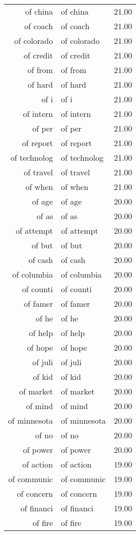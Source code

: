 \begin{table}[ht]
\begin{tabular}{rlr}
  of china & of china & 21.00 \\ 
  of coach & of coach & 21.00 \\ 
  of colorado & of colorado & 21.00 \\ 
  of credit & of credit & 21.00 \\ 
  of from & of from & 21.00 \\ 
  of hard & of hard & 21.00 \\ 
  of i & of i & 21.00 \\ 
  of intern & of intern & 21.00 \\ 
  of per & of per & 21.00 \\ 
  of report & of report & 21.00 \\ 
  of technolog & of technolog & 21.00 \\ 
  of travel & of travel & 21.00 \\ 
  of when & of when & 21.00 \\ 
  of age & of age & 20.00 \\ 
  of as & of as & 20.00 \\ 
  of attempt & of attempt & 20.00 \\ 
  of but & of but & 20.00 \\ 
  of cash & of cash & 20.00 \\ 
  of columbia & of columbia & 20.00 \\ 
  of counti & of counti & 20.00 \\ 
  of famer & of famer & 20.00 \\ 
  of he & of he & 20.00 \\ 
  of help & of help & 20.00 \\ 
  of hope & of hope & 20.00 \\ 
  of juli & of juli & 20.00 \\ 
  of kid & of kid & 20.00 \\ 
  of market & of market & 20.00 \\ 
  of mind & of mind & 20.00 \\ 
  of minnesota & of minnesota & 20.00 \\ 
  of no & of no & 20.00 \\ 
  of power & of power & 20.00 \\ 
  of action & of action & 19.00 \\ 
  of communic & of communic & 19.00 \\ 
  of concern & of concern & 19.00 \\ 
  of financi & of financi & 19.00 \\ 
  of fire & of fire & 19.00 \\ 

\end{tabular}
\end{table}
